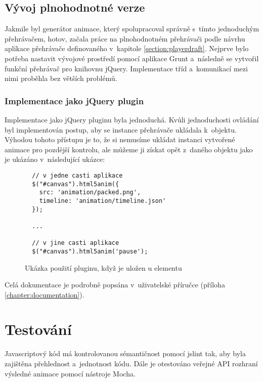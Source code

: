 \subsection{Vývoj plnohodnotné verze}

Jakmile byl generátor animace, který spolupracoval správně s~tímto jednoduchým přehrávačem, hotov, začala práce na plnohodnotném přehrávači podle návrhu aplikace přehrávače definovaného v~kapitole \ref{section:playerdraft}. Nejprve bylo potřeba nastavit vývojové prostředí pomocí aplikace Grunt a~následně se vytvořil funkční přehrávač pro knihovnu jQuery. Implementace tříd a~komunikací mezi nimi proběhla bez větších problémů.

\subsubsection*{Implementace jako jQuery plugin}

Implementace jako jQuery pluginu byla jednoduchá. Kvůli jednoduchosti ovládání byl implementován postup, aby se instance přehrávače ukládala k~objektu. Výhodou tohoto přístupu je to, že si nemusíme ukládat instanci vytvořené animace pro pozdější kontrolu, ale můžeme ji získat opět z~daného objektu jako je ukázáno v~následující ukázce:

\begin{figure}[h]
\caption{Ukázka použití pluginu, když je uložen u elementu}
\begin{lstlisting}
  // v jedne casti aplikace
  $("#canvas").html5anim({
    src: 'animation/packed.png',
    timeline: 'animation/timeline.json'
  });

  ...

  // v jine casti aplikace
  $("#canvas").html5anim('pause');
\end{lstlisting}
\end{figure}

Celá dokumentace je podrobně popsána v~uživatelské příručce (příloha \ref{chapter:documentation}).

\section{Testování}

Javascriptový kód má kontrolovanou sémantičnost pomocí jslint\cite{jslint} tak, aby byla zajištěna přehlednost a~jednotnost kódu. Dále je otestováno veřejné API rozhraní výsledné animace pomocí nástroje Mocha\cite{mocha}.
